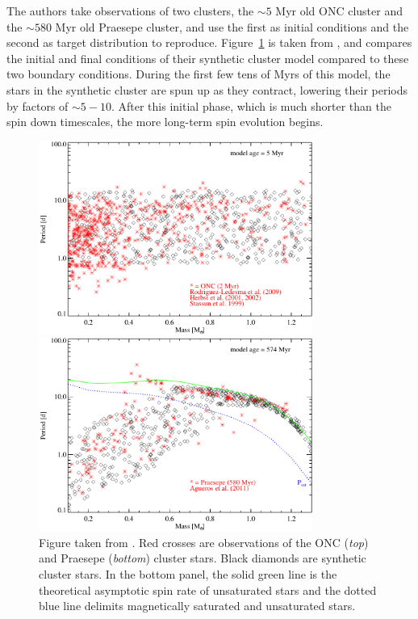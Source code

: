 The authors take observations of two clusters, the $\sim 5$ Myr old ONC cluster and the $\sim 580$ Myr old Praesepe cluster, and use the first as initial conditions and the second as target distribution to reproduce. Figure~\ref{fig:introduction:Matt 2015 figure 2} is taken from \citet{matt2015}, and compares the initial and final conditions of their synthetic cluster model compared to these two boundary conditions. During the first few tens of Myrs of this model, the stars in the synthetic cluster are spun up as they contract, lowering their periods by factors of $\sim 5-10$. After this initial phase, which is much shorter than the spin down timescales, the more long-term spin evolution begins.

\begin{figure}[!tbp]
    \centering
    \begin{minipage}[b]{\textwidth}
        \centering
        \includegraphics[width=0.8\textwidth]{figures/introduction/matt_2015_fig2a.pdf}
    \end{minipage}
    \begin{minipage}[b]{\textwidth}
        \centering
        \includegraphics[width=0.8\textwidth]{figures/introduction/matt_2015_fig2b.pdf}
    \end{minipage}
    \caption{Figure taken from \citet{matt2015}. Red crosses are observations of the ONC ({\it top}) and Praesepe ({\it bottom}) cluster stars. Black diamonds are synthetic cluster stars. In the bottom panel, the solid green line is the theoretical asymptotic spin rate of unsaturated stars and the dotted blue line delimits magnetically saturated and unsaturated stars.}
    \label{fig:introduction:Matt 2015 figure 2}
\end{figure}

